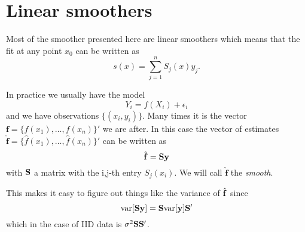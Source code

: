 \section{Linear smoothers}
Most of the smoother presented here are linear smoothers which means
that the fit at any point $x_0$ can be written as 
\[
s(x) = \sum_{j=1}^n S_{j}(x) y_j.
\]

In practice we usually have the model 
\[
Y_i = f(X_i) + \epsilon_i
\]
and we have observations $\{(x_i, y_i)\}$. Many times it is the vector
${\mathbf f} = \{f(x_1),\dots,f(x_n)\}'$ we are after. In this case
the vector of estimates $\hat{\mathbf f} =
\{\hat{f}(x_1),\dots,\hat{f}(x_n)\}'$ can be written as
\[
\hat{\mathbf f} = {\mathbf S} {\mathbf y}
\]
with ${\mathbf S}$ a matrix with the i,j-th entry $S_{j}(x_i)$. We will call
$\hat{\mathbf f}$ the {\it smooth}.

This makes it easy to figure out things like the variance of
$\hat{{\mathbf f}}$ since 
\[
\mbox{var}[{\mathbf S} {\mathbf y}] = {\mathbf S} \mbox{var}[{\mathbf y}] {\mathbf S}' 
\]
which in the case of IID data is $\sigma^2 {\mathbf S}{\mathbf S}'$.
